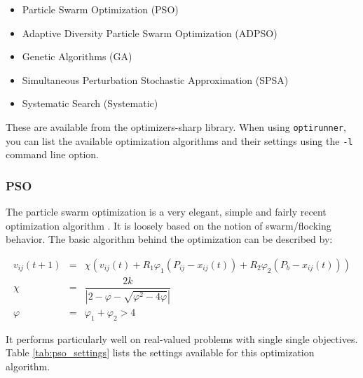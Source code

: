 \documentclass{article}
\begin{document}
\begin{itemize}
	\item Particle Swarm Optimization (PSO)
	\item Adaptive Diversity Particle Swarm Optimization (ADPSO)
	\item Genetic Algorithms (GA)
	\item Simultaneous Perturbation Stochastic Approximation (SPSA)
	\item Systematic Search (Systematic)
\end{itemize}

These are available from the optimizers-sharp library. When using
\verb!optirunner!, you can list the available optimization algorithms and
their settings using the \verb!-l! command line option.

\subsubsection{PSO}
The particle swarm optimization is a very elegant, simple and fairly recent
optimization algorithm \cite{kennedy_pso_1995,clerc_pse_2002}. It is 
loosely based on the notion of swarm/flocking behavior. The basic algorithm
behind the optimization can be described by:

\begin{eqnarray*}
	v_{ij}(t + 1) & = & \chi (v_{ij}(t) + R_1 \varphi_1 (P_{ij} - x_{ij}(t)) + R_2 \varphi_2 (P_b - x_{ij}(t))) \\
	\chi & = & \dfrac{2k}{|2 - \varphi - \sqrt{\varphi^2 - 4\varphi}|} \\
	\varphi & = & \varphi_1 + \varphi_2 > 4
\end{eqnarray*}

It performs particularly well on real-valued problems with single single
objectives. Table \ref{tab:pso_settings} lists the settings available for this
optimization algorithm.
\end{document}

